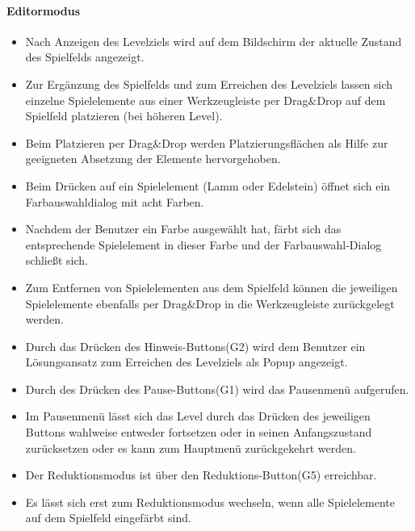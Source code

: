 \paragraph{Editormodus}
\begin{itemize}
	\item Nach Anzeigen des Levelziels wird auf dem Bildschirm der aktuelle Zustand des Spielfelds angezeigt.
	\item Zur Ergänzung des Spielfelds und zum Erreichen des Levelziels lassen sich einzelne Spielelemente aus einer Werkzeugleiste per Drag$\&$Drop auf dem Spielfeld platzieren (bei höheren Level).
	\item Beim Platzieren per Drag$\&$Drop werden Platzierungsflächen als Hilfe zur geeigneten Absetzung der Elemente hervorgehoben.
	\item Beim Drücken auf ein Spielelement (Lamm oder Edelstein) öffnet sich ein Farbauswahldialog mit acht Farben.
	\item Nachdem der Benutzer ein Farbe ausgewählt hat, färbt sich das entsprechende Spielelement in dieser Farbe und der Farbauswahl-Dialog schließt sich.
	\item Zum Entfernen von Spielelementen aus dem Spielfeld können die jeweiligen Spielelemente ebenfalls per Drag$\&$Drop in die Werkzeugleiste zurückgelegt werden.
	\item Durch das Drücken des Hinweis-Buttons(G2) wird dem Benutzer ein Lösungsansatz zum Erreichen des Levelziels als Popup angezeigt.
	\item Durch des Drücken des Pause-Buttons(G1) wird das Pausenmenü aufgerufen.
	\item Im Pausenmenü lässt sich das Level durch das Drücken des jeweiligen Buttons wahlweise entweder fortsetzen oder in seinen Anfangszustand zurücksetzen oder es kann zum Hauptmenü zurückgekehrt werden.
	\item Der Reduktionsmodus ist über den Reduktions-Button(G5) erreichbar. 
	\item Es lässt sich erst zum Reduktionsmodus wechseln, wenn alle Spielelemente auf dem Spielfeld eingefärbt sind.
\end{itemize}

